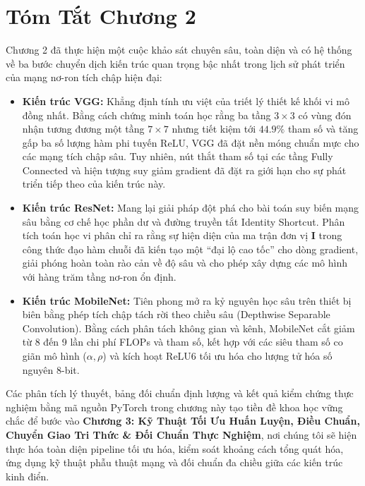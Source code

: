 \documentclass[12pt,a4paper]{report}
\begin{document}
\section{Tóm Tắt Chương 2}
Chương 2 đã thực hiện một cuộc khảo sát chuyên sâu, toàn diện và có hệ thống về ba bước chuyển dịch kiến trúc quan trọng bậc nhất trong lịch sử phát triển của mạng nơ-ron tích chập hiện đại:
\begin{itemize}[leftmargin=*]
    \item \textbf{Kiến trúc VGG:} Khẳng định tính ưu việt của triết lý thiết kế khối vi mô đồng nhất. Bằng cách chứng minh toán học rằng ba tầng $3 \times 3$ có vùng đón nhận tương đương một tầng $7 \times 7$ nhưng tiết kiệm tới $44.9\%$ tham số và tăng gấp ba số lượng hàm phi tuyến ReLU, VGG đã đặt nền móng chuẩn mực cho các mạng tích chập sâu. Tuy nhiên, nút thắt tham số tại các tầng Fully Connected và hiện tượng suy giảm gradient đã đặt ra giới hạn cho sự phát triển tiếp theo của kiến trúc này.
    \item \textbf{Kiến trúc ResNet:} Mang lại giải pháp đột phá cho bài toán suy biến mạng sâu bằng cơ chế học phần dư và đường truyền tắt Identity Shortcut. Phân tích toán học vi phân chỉ ra rằng sự hiện diện của ma trận đơn vị $\mathbf{I}$ trong công thức đạo hàm chuỗi đã kiến tạo một ``đại lộ cao tốc'' cho dòng gradient, giải phóng hoàn toàn rào cản về độ sâu và cho phép xây dựng các mô hình với hàng trăm tầng nơ-ron ổn định.
    \item \textbf{Kiến trúc MobileNet:} Tiên phong mở ra kỷ nguyên học sâu trên thiết bị biên bằng phép tích chập tách rời theo chiều sâu (Depthwise Separable Convolution). Bằng cách phân tách không gian và kênh, MobileNet cắt giảm từ 8 đến 9 lần chi phí FLOPs và tham số, kết hợp với các siêu tham số co giãn mô hình ($\alpha, \rho$) và kích hoạt ReLU6 tối ưu hóa cho lượng tử hóa số nguyên 8-bit.
\end{itemize}

Các phân tích lý thuyết, bảng đối chuẩn định lượng và kết quả kiểm chứng thực nghiệm bằng mã nguồn PyTorch trong chương này tạo tiền đề khoa học vững chắc để bước vào \textbf{Chương 3: Kỹ Thuật Tối Ưu Huấn Luyện, Điều Chuẩn, Chuyển Giao Tri Thức \& Đối Chuẩn Thực Nghiệm}, nơi chúng tôi sẽ hiện thực hóa toàn diện pipeline tối ưu hóa, kiểm soát khoảng cách tổng quát hóa, ứng dụng kỹ thuật phẫu thuật mạng và đối chuẩn đa chiều giữa các kiến trúc kinh điển.

\end{document}
